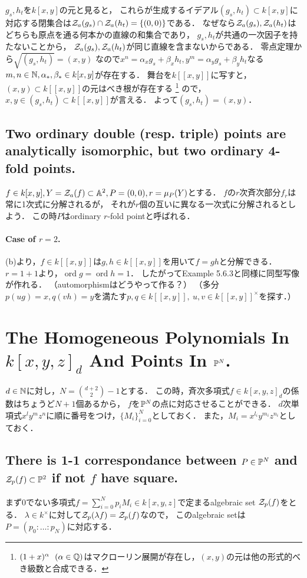 \documentclass[a4paper]{jsarticle}
\newcommand{\ord}{\operatorname{ord}}
\begin{document}
    $g_s, h_t$を$k[x,y]$の元と見ると，
    これらが生成するイデアル$(g_s,h_t) \subset k[x,y]$に対応する閉集合は$\mathcal{Z}_a(g_s) \cap \mathcal{Z}_a(h_t)=\{(0,0)\}$である．
    なぜなら$\mathcal{Z}_a(g_s), \mathcal{Z}_a(h_t)$はどちらも原点を通る何本かの直線の和集合であり，
    $g_{s}, h_{t}$が共通の一次因子を持たないことから，
    $\mathcal{Z}_a(g_s), \mathcal{Z}_a(h_t)$が同じ直線を含まないからである．
    零点定理から$\sqrt{(g_s,h_t)}=(x,y)$
    なので$x^n=\alpha_x g_s+\beta_x h_t, y^m=\alpha_y g_s+\beta_y h_t$なる
    $m,n \in \mathbb{N}, \alpha_{\ast}, \beta_{\ast} \in k[x,y]$が存在する．
    舞台を$k[[x,y]]$に写すと，
    $(x,y) \subset k[[x,y]]$の元はべき根が存在する
    \footnote{$(1+x)^{\alpha} ~~(\alpha \in \mathbb{Q})$はマクローリン展開が存在し，$(x,y)$の元は他の形式的べき級数と合成できる．}
    ので，
    $x,y \in (g_s,h_t) \subset k[[x,y]]$が言える．
    よって$(g_s,h_t)=(x,y)$．

    \subsection{Two ordinary double (resp. triple) points are analytically isomorphic, but two ordinary 4-fold points.}
    $f \in k[x,y], Y=\mathcal{Z}_a(f) \subset \mathbb{A}^2, P=(0,0), r=\mu_P(Y)$とする．
    $f$の$r$次斉次部分$f_r$は常に1次式に分解されるが，
    それが$r$個の互いに異なる一次式に分解されるとしよう．
    この時$P$はordinary $r$-fold pointと呼ばれる．
    
    \paragraph{Case of $r=2$.}
    (b)より，$f \in k[[x,y]]$は$g,h \in k[[x,y]]$を用いて$f=gh$と分解できる．
    $r=1+1$より，$\ord g=\ord h=1$．
    したがってExample 5.6.3と同様に同型写像が作れる．
    （automorphismはどうやって作る？）
    （多分$p(ug)=x, q(vh)=y$を満たす$p,q \in k[[x,y]], ~u,v \in k[[x,y]]^{\times}$を探す．）

\section{The Homogeneous Polynomials In $k[x,y,z]_d$ And Points In $\mathbb{P}^N$.} %
    $d \in \mathbb{N}$に対し，$N=\binom{d+2}{2}-1$とする．
    この時，斉次多項式$f \in k[x,y,z]_d$の係数はちょうど$N+1$個あるから，
    $f$を$\mathbb{P}^N$の点に対応させることができる．
    $d$次単項式$x^l y^m z^n$に順に番号をつけ，$\{M_i\}_{i=0}^{N}$としておく．
    また，$M_i=x^{l_i} y^{m_i} z^{n_i}$としておく．

    \subsection{There is 1-1 correspondance between $P \in \mathbb{P}^N$ and $\mathcal{Z}_p(f) \subset \mathbb{P}^2$ if not $f$ have square.}
    まず0でない多項式$f=\sum_{i=0}^{N}p_i M_i \in k[x,y,z]$で定まるalgebraic set $\mathcal{Z}_p(f)$をとる．
    $\lambda \in k^{\times}$に対して$\mathcal{Z}_p(\lambda f)=\mathcal{Z}_p(f)$なので，
    このalgebraic setは$P=(p_0:\dots:p_N)$に対応する．
\end{document}
